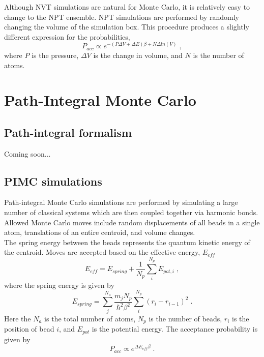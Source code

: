 \documentclass[12pt]{report}
\begin{document}
Although NVT simulations are natural for Monte Carlo, it is relatively easy to
change to the NPT ensemble.
NPT simulations are performed by randomly changing the volume of the
simulation box.
This procedure produces a slightly different expression for the probabilities,
\begin{equation}
 P_{acc} \propto e^{-(P\Delta V+\Delta E)\beta+N\Delta ln(V)} \; ,
\end{equation}
where $P$ is the pressure, $\Delta V$ is the change in volume, and $N$ is
the number of atoms.

\section{Path-Integral Monte Carlo}

\subsection{Path-integral formalism}

{\color{red}Coming soon...}

\subsection{PIMC simulations}

Path-integral Monte Carlo simulations are performed by simulating a large
number of classical systems which are then coupled together via harmonic
bonds.
Allowed Monte Carlo moves include random displacements of all beads in a
single atom, translations of an entire centroid, and volume changes. \\

The spring energy between the beads represents the quantum kinetic energy of
the centroid.
Moves are accepted based on the effective energy, $E_{eff}$
\begin{equation}
 E_{eff} = E_{spring}+\frac{1}{N_p}\sum_i^{N_p} E_{pot,i} \; ,
\end{equation}
where the spring energy is given by
\begin{equation}
 E_{spring} = \sum_{j}^{N_a} \frac{m_{j}N_{p}}{\hbar^2\beta^2}
              \sum_{i}^{N_p} (r_{i}-r_{i-1})^2  \; .
\end{equation}
Here the $N_a$ is the total number of atoms, $N_p$ is the number of beads,
$r_i$ is the position of bead $i$, and $E_{pot}$ is the potential energy.
The acceptance probability is given by
\begin{equation}
 P_{acc} \propto e^{\Delta E_{eff}\beta} \; .
\end{equation}
\end{document}

